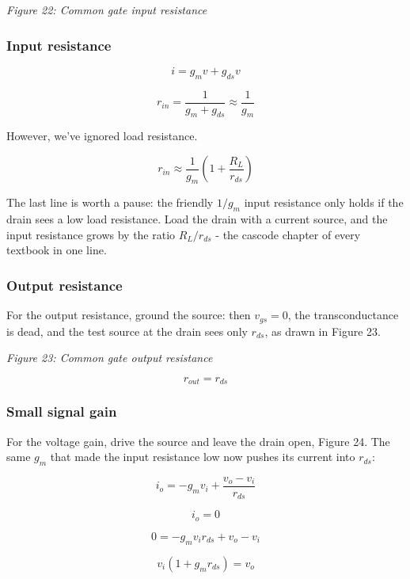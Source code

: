 {
\centering
{}
}

\emph{Figure 22: Common gate input resistance}

\subsubsection{Input resistance}\label{input-resistance}

\[ i = g_m v + g_{ds} v \]

\[ r_{in} = \frac{1}{g_m + g_{ds}} \approx \frac{1}{g_m}\]

However, we've ignored load resistance.

\[ r_{in}  \approx \frac{1}{g_m}\left(1 + \frac{R_L}{r_{ds}}\right) \]

The last line is worth a pause: the friendly \(1/g_m\) input resistance
only holds if the drain sees a low load resistance. Load the drain with
a current source, and the input resistance grows by the ratio
\(R_L/r_{ds}\) - the cascode chapter of every textbook in one line.

\subsubsection{Output resistance}\label{output-resistance-1}

For the output resistance, ground the source: then \(v_{gs} = 0\), the
transconductance is dead, and the test source at the drain sees only
\(r_{ds}\), as drawn in Figure 23.


{
\centering
{}
}

\emph{Figure 23: Common gate output resistance}

\[ r_{out} = r_{ds} \]

\subsubsection{Small signal gain}\label{small-signal-gain-1}

For the voltage gain, drive the source and leave the drain open, Figure
24. The same \(g_m\) that made the input resistance low now pushes its
current into \(r_{ds}\):

\[ i_{o} = - g_m v_{i} + \frac{v_{o} - v_{i}}{r_{ds}} \]

\[ i_{o}  = 0 \]

\[ 0 = - g_m v_{i} r_{ds}  + v_{o} - v_{i}\]

\[ v_{i} (1 + g_m r_{ds}) = v_{o} \]

